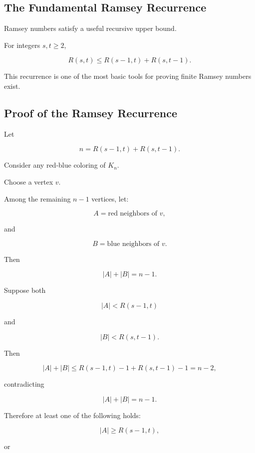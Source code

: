 \subsection{The Fundamental Ramsey Recurrence}
\label{subsec:ramsey-recurrence}

Ramsey numbers satisfy a useful recursive upper bound.

\begin{theorem}
For integers \(s,t\geq2\),

\[
\boxed{
R(s,t)
\leq
R(s-1,t)+R(s,t-1).
}
\]
\end{theorem}

This recurrence is one of the most basic tools for proving finite Ramsey
numbers exist.

\subsection{Proof of the Ramsey Recurrence}
\label{subsec:proof-ramsey-recurrence}

Let

\[
n
=
R(s-1,t)+R(s,t-1).
\]

Consider any red-blue coloring of \(K_n\).

Choose a vertex \(v\).

Among the remaining \(n-1\) vertices, let:

\[
A
=
\text{red neighbors of }v,
\]

and

\[
B
=
\text{blue neighbors of }v.
\]

Then

\[
|A|+|B|=n-1.
\]

Suppose both

\[
|A|<R(s-1,t)
\]

and

\[
|B|<R(s,t-1).
\]

Then

\[
|A|+|B|
\leq
R(s-1,t)-1
+
R(s,t-1)-1
=
n-2,
\]

contradicting

\[
|A|+|B|=n-1.
\]

Therefore at least one of the following holds:

\[
|A|\geq R(s-1,t),
\]

or

